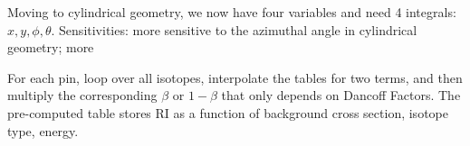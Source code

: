 \documentclass{school-22.211-notes}
\begin{document}
Moving to cylindrical geometry, we now have four variables and need 4 integrals: $x,y, \phi, \theta$. Sensitivities: more sensitive to the azimuthal angle in cylindrical geometry; more 


For each pin, loop over all isotopes, interpolate the tables for two terms, and then multiply the corresponding $\beta$ or $1-\beta$ that only depends on Dancoff Factors. The pre-computed table stores RI as a function of background cross section, isotope type, energy. 


\clearpage
\end{document}
